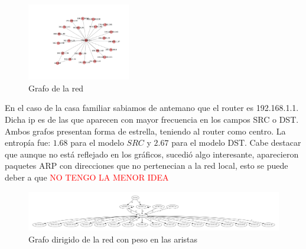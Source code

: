 \begin{figure}
\vspace{-35pt}
\hspace{-35pt}
\centering
   \includegraphics[width=0.4\textwidth]{resultados/casa/conectividadNX.pdf}
\vspace{-30pt}
   \caption{Grafo de la red}
\end{figure}

En el caso de la casa familiar sabiamos de antemano que el router es 192.168.1.1. Dicha ip es de las
que aparecen con mayor frecuencia en los campos SRC o DST. Ambos grafos presentan forma de estrella,
teniendo al router como centro. La entrop\'ia fue: $1.68$ para el modelo $SRC$ y $2.67$ para el modelo
DST. Cabe destacar que aunque no est\'a reflejado en los gr\'aficos, sucedi\'o algo interesante, 
aparecieron paquetes ARP con direcciones que no pertenecian a la red local, esto se puede deber a que
 \textcolor{red}{NO TENGO LA MENOR IDEA}





\begin{figure}[H]
   \includegraphics[width=1.0\textwidth]{resultados/casa/conectividad.pdf}
   \caption{Grafo dirigido de la red con peso en las aristas}
\end{figure}





